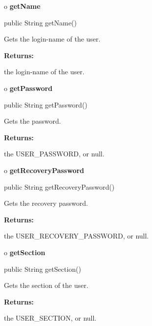 o {\bf getName} 

\begin{PRE}
 public String getName()
\end{PRE}

\begin{description}
\htmlDD Gets the login-name of the user. 

\begin{description}
\item {\bf Returns:}  

the login-name of the user.  
\end{description}

\end{description}

o {\bf getPassword} 

\begin{PRE}
 public String getPassword()
\end{PRE}

\begin{description}
\htmlDD Gets the password. 

\begin{description}
\item {\bf Returns:}  

the USER\_PASSWORD, or null.  
\end{description}

\end{description}

o {\bf getRecoveryPassword} 

\begin{PRE}
 public String getRecoveryPassword()
\end{PRE}

\begin{description}
\htmlDD Gets the recovery password. 

\begin{description}
\item {\bf Returns:}  

the USER\_RECOVERY\_PASSWORD, or null.  
\end{description}

\end{description}

o {\bf getSection} 

\begin{PRE}
 public String getSection()
\end{PRE}

\begin{description}
\htmlDD Gets the section of the user. 

\begin{description}
\item {\bf Returns:}  

the USER\_SECTION, or null.  
\end{description}

\end{description}

